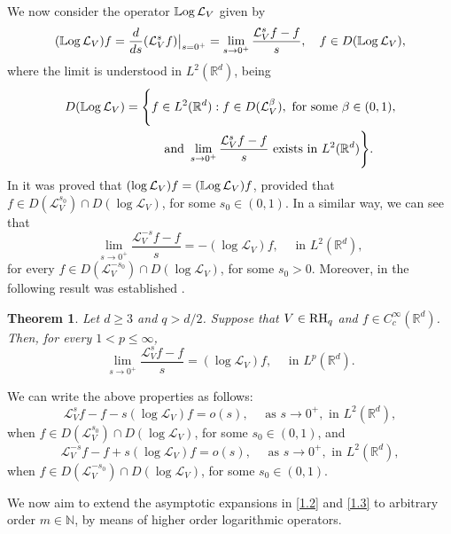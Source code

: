 \documentclass[10pt, a4paper, reqno]{amsart}
\newtheorem{ThA}{Theorem}
\theoremstyle{definition}
\theoremstyle{remark}
\newcommand{\RH}{\textup{RH}}
\numberwithin{equation}{section}
\begin{document}
We now consider the operator $\mathbb{L}{\rm og}\, \mathcal L_V$ given by
\[
(\mathbb{L}{\rm og}\, \mathcal L_V)f=\frac{d}{ds}(\mathcal L_V^sf)\big\vert_{s=0^+}=\lim_{s\rightarrow 0^+}\frac{\mathcal L_V^sf-f}{s},\quad f\in D(\mathbb{L}{\rm og}\, \mathcal L_V),
\]
where the limit is understood in   $L^2(\mathbb R^d)$, 
being 
\begin{align*}
D(\mathbb{L}{\rm og}\, \mathcal L_V)&=\Bigg\{f\in L^2(\mathbb R^d): f\in D(\mathcal L_V^\beta),\mbox{ for some }\beta \in (0,1),\\
&\hspace{1cm}\mbox{ and }\lim_{s\rightarrow 0^+}\frac{\mathcal L_V^sf-f}{s}\mbox{ exists in }L^2(\mathbb R^d)\Bigg\}.
\end{align*}
In \cite[Theorem 1.1(a)]{BDFQ} it was proved that $(\log \mathcal L_V)f=(\mathbb{L}{\rm og}\, \mathcal L_V)f$, provided that $f\in D(\mathcal L_V^{s_0})\cap D(\log \mathcal L_V)$, for some $s_0\in (0,1)$. In a similar way, we can see that
\[
\lim_{s\rightarrow 0^+}\frac{\mathcal L_V^{-s}f-f}{s}=-(\log \mathcal L_V)f,\quad \mbox{ in }L^2(\mathbb R^d),
\]
for every $f\in D(\mathcal L_V^{-s_0})\cap D(\log \mathcal L_V)$, for some $s_0>0$. Moreover, in \cite[Theorem 1.2]{BDFQ} the following result was established .

\begin{ThA}\label{ThC}
    Let $d\geq 3$ and $q>d/2$. Suppose that $V\in \RH_q$ and $f\in C_c^\infty (\mathbb R^d)$. Then, for every $1<p\leq \infty$,
    \[
    \lim_{s\rightarrow 0^+}\frac{\mathcal L_V^sf-f}{s}=(\log \mathcal L_V)f,\quad \mbox{ in }L^p(\mathbb R^d).
    \]
\end{ThA}

We can write the above properties as follows:
\begin{equation}\label{1.2}
  \mathcal L_V^sf-f-s(\log \mathcal L_V)f=o(s),\quad \mbox{ as }s\rightarrow 0^+,\mbox{ in }L^2(\mathbb R^d),  
\end{equation}
when $f\in D(\mathcal L_V^{s_0})\cap D(\log \mathcal L_V)$, for some $s_0 \in (0,1)$, and 
\begin{equation}\label{1.3}
    \mathcal L_V^{-s}f-f+s(\log \mathcal L_V)f=o(s),\quad \mbox{ as }s\rightarrow 0^+,\mbox{ in }L^2(\mathbb R^d),   
\end{equation}
when $f\in D(\mathcal L_V^{-s_0})\cap D(\log \mathcal L_V)$, for some $s_0 \in (0,1)$.

We now aim to extend the asymptotic expansions in \eqref{1.2} and \eqref{1.3} to arbitrary order $m\in\mathbb{N}$, by means of higher order logarithmic operators.
\end{document}
